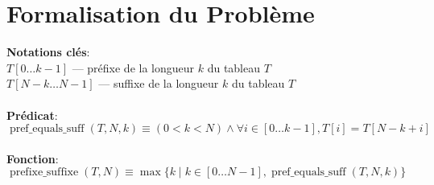 \section{Formalisation du Problème}\label{formalisation}


\textbf{Notations clés}:\\
    $ T[0 \dots k-1] $ — préfixe de la longueur $k$ du tableau $T$\\
    $ T[N-k \dots N-1] $ — suffixe de la longueur $k$ du tableau $T$\\
\\
\textbf{Prédicat}:\\
$ \operatorname{pref\_equals\_suff}(T, N, k) \equiv (0 < k < N) \land \forall i \in [0 \dots k - 1], T[i] = T[N - k + i]$\\
\\
\textbf{Fonction}:\\
$ \operatorname{prefixe\_suffixe}(T, N) \equiv \max\{k \mid k \in [0 \dots N - 1], \operatorname{pref\_equals\_suff}(T, N, k)\} $ \\
